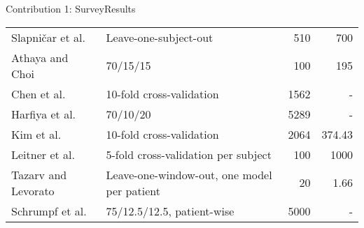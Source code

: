 \begin{frame}{Contribution 1: Survey}{Results}
\begin{table}
\begin{tabularx}{\textwidth}{ l X r  r }
            \hline
            Slapničar et al. \cite{slapnicar_blood_2019}    & Leave-one-subject-out                       & 510              & 700                     \\
            Athaya and Choi \cite{athaya_estimation_2021}   & 70/15/15                                    & 100              & 195                     \\
            Chen et al. \cite{chen_new_2022}                & 10-fold cross-validation                    & 1562             & -                       \\
            Harfiya et al. \cite{harfiya_continuous_2021}   & 70/10/20                                    & 5289             & -                       \\
            Kim et al. \cite{kim_deepcnap_2022}             & 10-fold cross-validation                    & 2064             & 374.43                  \\
            Leitner et al. \cite{leitner_personalized_2022} & 5-fold cross-validation per subject         & 100              & 1000                    \\
            Tazarv and Levorato \cite{tazarv_deep_2021}     & Leave-one-window-out, one model per patient & 20               & 1.66                    \\
            Schrumpf et al. \cite{schrumpf_assessment_2021} & 75/12.5/12.5, patient-wise                  & 5000             & -                       \\
            \hline
        \end{tabularx}
    \end{table}
\end{frame}